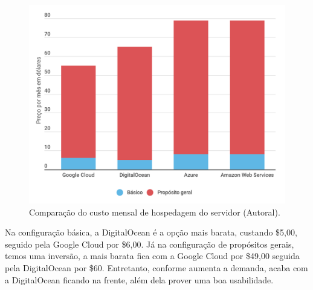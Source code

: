 \begin{figure}[H]
  \centering
  \includegraphics[width=.80\textwidth]{assets/server-chart.png} 
  \caption{Comparação do custo mensal de hospedagem do servidor (Autoral).}
  \label{fig:server-chart} 
\end{figure}

Na configuração básica, a DigitalOcean é a opção mais barata, custando \$5,00, seguido pela Google Cloud por \$6,00. Já na configuração de propósitos gerais, temos uma inversão, a mais barata fica com a Google Cloud por \$49,00 seguida pela DigitalOcean por \$60. Entretanto, conforme aumenta a demanda, acaba com a DigitalOcean ficando na frente, além dela prover uma boa usabilidade.